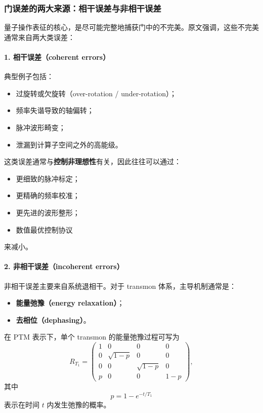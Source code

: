 \documentclass[12pt,a4paper,oneside]{ctexbook}
\begin{document}
\subsubsection{门误差的两大来源：相干误差与非相干误差}

量子操作表征的核心，是尽可能完整地捕获门中的不完美。原文强调，这些不完美通常来自两大类误差：

\paragraph{1. 相干误差（coherent errors）}
典型例子包括：
\begin{itemize}
    \item 过旋转或欠旋转（over-rotation / under-rotation）；
    \item 频率失谐导致的轴偏转；
    \item 脉冲波形畸变；
    \item 泄漏到计算子空间之外的高能级。
\end{itemize}

这类误差通常与\textbf{控制非理想性}有关，因此往往可以通过：
\begin{itemize}
    \item 更细致的脉冲标定；
    \item 更精确的频率校准；
    \item 更先进的波形整形；
    \item 数值最优控制协议
\end{itemize}
来减小。

\paragraph{2. 非相干误差（incoherent errors）}
非相干误差主要来自系统退相干。对于 transmon 体系，主导机制通常是：
\begin{itemize}
    \item \textbf{能量弛豫（energy relaxation）}；
    \item \textbf{去相位（dephasing）}。
\end{itemize}

在 PTM 表示下，单个 transmon 的能量弛豫过程可写为
\begin{equation}
R_{T_1}
=
\begin{pmatrix}
1 & 0 & 0 & 0 \\
0 & \sqrt{1-p} & 0 & 0 \\
0 & 0 & \sqrt{1-p} & 0 \\
p & 0 & 0 & 1-p
\end{pmatrix},
\tag{72}
\end{equation}
其中
\[
p=1-e^{-t/T_1}
\]
表示在时间 \(t\) 内发生弛豫的概率。
\end{document}
